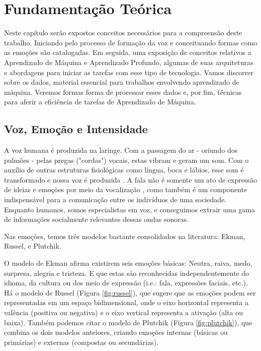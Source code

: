 \chapter{Fundamentação Teórica}\label{Cap:Fundamentação Teórica}

Neste capítulo serão expostos conceitos necessários para a compreensão deste trabalho. Iniciando pelo processo de formação da voz e conceituando formas como as emoções são catalogadas. Em seguida, uma exposição de conceitos relativos a Aprendizado de Máquina e Aprendizado Profundo, algumas de suas arquiteturas e abordagens para iniciar as tarefas com esse tipo de tecnologia. Vamos discorrer sobre os dados, material essencial para trabalhos envolvendo aprendizado de máquina. Veremos formas forma de processar esses dados e, por fim, técnicas para aferir a eficiência de tarefas de Aprendizado de Máquina.\\

\section{Voz, Emoção e Intensidade}

A voz humana é produzida na laringe. Com a passagem do ar - oriundo dos pulmões - pelas pregas ("cordas") vocais, estas vibram e geram um som. Com o auxílio de outras estruturas fisiológicas como língua, boca e lábios, esse som é transformado e nossa voz é produzida \cite{51}. A fala não é somente um ato de expressão de ideias e emoções por meio da vocalização \cite{6.31}, como também é um componente indispensável para a comunicação entre os indivíduos de uma sociedade. Enquanto humanos, somos especialistas em voz, e conseguimos extrair uma gama de informações socialmente relevantes \cite{49} dessas ondas sonoras.

Nas emoções, temos três modelos bastante consolidados na literatura: Ekman, Russel, e Plutchik.

O modelo de Ekman \cite{31.9} afirma existirem seis emoções básicas: Neutra, raiva, medo, surpresa, alegria e tristeza. E que estas são reconhecidas independentemente do idioma, da cultura ou dos meio de expressão (i.e.: fala, expressões faciais, etc.). Há o modelo de Russel \cite{31.10} (Figura \ref{fig:russel}), que sugere que as emoções podem ser representadas em um espaço bidimensional, onde o eixo horizontal representa a valência (positiva ou negativa) e o eixo vertical representa a ativação (alta ou baixa). Também podemos citar o modelo de Plutchik \cite{31.11} (Figura \ref{fig:plutchik}), que combina os dois modelos anteiores, criando emoções internas (básicas ou primárias) e externas (compostas ou secundárias).

